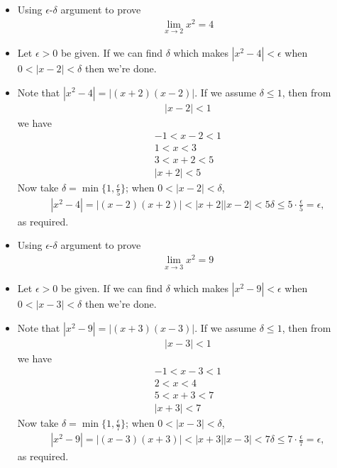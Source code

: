\begin{itemize}
\item Using $\epsilon$-$\delta$ argument to prove
\begin{align*}
\lim_{x\to 2}x^2 = 4
\end{align*}
\item
Let $\epsilon > 0$ be given. If we can find $\delta$ which makes $|x^2 - 4| < \epsilon$ when $0 < |x - 2| < \delta$ then we're done.
\item Note that $|x^2 - 4| = |(x + 2)(x - 2)|$. If we assume $\delta\leqslant 1$, then from
\begin{align*}
|x - 2| < 1
\end{align*}
we have
\begin{gather*}
-1 < x - 2 < 1 \\
1 < x < 3 \\
3 < x + 2 < 5 \\
|x + 2| < 5
\end{gather*}
Now take $\delta = \min\{1, \frac{\epsilon}{5}\}$; when $0 < |x - 2| < \delta$,
\begin{align*}
|x^2 - 4| = |(x - 2)(x + 2)| < |x + 2||x - 2| < 5\delta \leqslant 5\cdot\frac{\epsilon}{5}= \epsilon,
\end{align*}
as required.
\end{itemize}
\begin{itemize}
\item Using $\epsilon$-$\delta$ argument to prove
\begin{align*}
\lim_{x\to 3}x^2 = 9
\end{align*}
\item
Let $\epsilon > 0$ be given. If we can find $\delta$ which makes $|x^2 - 9| < \epsilon$ when $0 < |x - 3| < \delta$ then we're done.
\item Note that $|x^2 - 9| = |(x + 3)(x - 3)|$. If we assume $\delta\leqslant 1$, then from
\begin{align*}
|x - 3| < 1
\end{align*}
we have
\begin{gather*}
-1 < x - 3 < 1 \\
2 < x < 4 \\
5 < x + 3 < 7 \\
|x + 3| < 7
\end{gather*}
Now take $\delta = \min\{1, \frac{\epsilon}{7}\}$; when $0 < |x - 3| < \delta$,
\begin{align*}
|x^2 - 9| = |(x - 3)(x + 3)| < |x + 3||x - 3| < 7\delta \leqslant 7\cdot\frac{\epsilon}{7}= \epsilon,
\end{align*}
as required.
\end{itemize}
